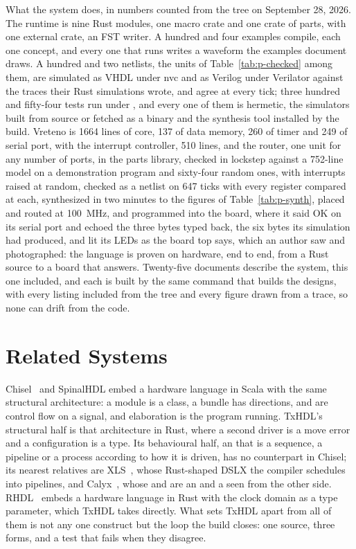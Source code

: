 \documentclass[journal,9pt]{IEEEtran}
\begin{document}
What the system does, in numbers counted from the tree on September
28, 2026. The runtime is nine Rust modules, one macro crate and one
crate of parts, with one
external crate, an FST writer. A hundred and four examples compile,
each one concept, and every one that runs writes a waveform the
examples document draws. A hundred and two netlists, the units of
Table~\ref{tab:p-checked} among them, are
simulated as VHDL under nvc and as Verilog under Verilator against
the traces their Rust simulations wrote, and agree at every tick;
three hundred and fifty-four tests run under ,
and every one of them
is hermetic, the simulators built from source or fetched as a binary
and the synthesis tool
installed by the build. Vreteno is 1664 lines of core, 137 of data
memory, 260 of timer and 249 of serial port, with the interrupt
controller, 510 lines, and the router, one unit for any number of
ports, in the parts library, checked in lockstep against a 752-line
model on a
demonstration program and sixty-four random ones, with interrupts raised at random, checked as a netlist on 647
ticks with every register compared at each, synthesized in two
minutes to the figures of Table~\ref{tab:p-synth}, placed and
routed at 100~MHz, and programmed into the board, where it said OK on
its serial port and echoed the three bytes typed back, the six bytes
its simulation had produced, and lit its LEDs as the board top says,
which an author saw and photographed: the language is proven on
hardware, end to end, from a Rust source to a board that answers.
Twenty-five documents describe the system, this one
included, and each is built by the same command that builds the
designs, with every listing included from the tree and every figure
drawn from a trace, so none can drift from the code.

\section{Related Systems}
\label{sec:p-related}

Chisel~\cite{bachrach2012} and SpinalHDL embed a hardware language in
Scala with the same structural architecture: a module is a class, a
bundle has directions,  and  are control flow on
a signal, and elaboration is the program running. TxHDL's structural
half is that architecture in Rust, where a second driver is a move
error and a configuration is a type. Its behavioural half, an
 that is a sequence, a pipeline or a process according
to how it is driven, has no counterpart in Chisel; its nearest
relatives are XLS~\cite{xls}, whose Rust-shaped DSLX the compiler
schedules into pipelines, and Calyx~\cite{calyx}, whose 
and  are an  and a  seen from
the other side. RHDL~\cite{rhdl} embeds a hardware language in Rust
with the clock domain as a type parameter, which TxHDL takes
directly. What sets TxHDL apart from all of them is not any one
construct but the loop the build closes: one source, three forms,
and a test that fails when they disagree.
\end{document}

